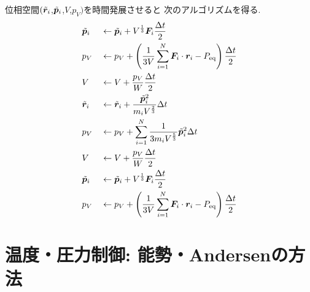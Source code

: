  位相空間$(\Tilde{\bm{r}}_{i}$,$\Tilde{\bm{p}}_{i}$,$V$,$p_{V})$を時間発展させると
 次のアルゴリズムを得る. 
\begin{alignat}{2}
  &\Tilde{\bm{p}}_{i}
  &&\gets
  \Tilde{\bm{p}}_{i}
  +
  V^{\frac{1}{3}} \bm{F}_{i} \frac{\Delta t}{2}
  \label{eq:Andersen21.1}
  \\
  & p_{V}
  &&\gets
  p_{V}
  + \left(
          \frac{1}{3V} \sum_{i=1}^{N} \bm{F}_{i}
          \cdot \bm{r}_{i} - P_{\mathrm{eq}}
    \right)
    \frac{\Delta t}{2}
  \label{eq:Andersen21.2}
  \\
  &V
  &&\gets
  V + \frac{p_{V}}{W} \frac{\Delta t}{2}
  \label{eq:Andersen21.3}
  \\
  &\Tilde{\bm{r}}_{i}
  &&\gets
  \Tilde{\bm{r}}_{i}
  + \frac{\Tilde{\bm{p}}_{i}^{2}}{m_{i} V^{\frac{2}{3}}} \Delta t
  \label{eq:Andersen21.4}
   \\
  &p_{V}
  &&\gets
  p_{V}
  + \sum_{i=1}^{N}
    \frac{1}{3 m_{i} V^{\frac{5}{3}}}
    \Tilde{\bm{p}}_{i}^{2} \Delta t
  \label{eq:Andersen21.5}
  \\
  &V
  &&\gets
  V + \frac{p_{V}}{W} \frac{\Delta t}{2}
  \label{eq:Andersen21.6}
  \\
  &\Tilde{\bm{p}}_{i}
  &&\gets
  \Tilde{\bm{p}}_{i}
  + V^{\frac{1}{3}} \bm{F}_{i} \frac{\Delta t}{2}
  \label{eq:Andersen21.4}
  \\
   &p_{V}
   &&\gets p_{V}
   + \left(
            \frac{1}{3V} \sum_{i=1}^{N} \bm{F}_{i}
            \cdot \bm{r}_{i} - P_{\mathrm{eq}}
    \right)
    \frac{\Delta t}{2}
 \label{eq:Andersen21.5}
\end{alignat}

\clearpage

\section{温度・圧力制御: 能勢・Andersenの方法}

